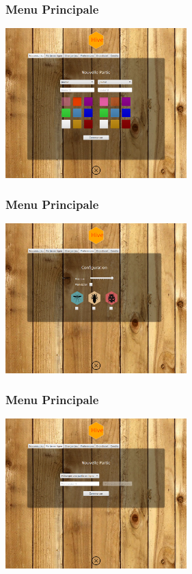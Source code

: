 \documentclass{beamer}
\begin{document}
\begin{frame}
    \frametitle{Menu Principale}
    \begin{center}
    \includegraphics[width=7cm]{menu.png}
    \end{center}
\end{frame}
\begin{frame}
    \frametitle{Menu Principale}
    \begin{center}
    \includegraphics[width=7cm]{preferences.png}
    \end{center}
\end{frame}
\begin{frame}
    \frametitle{Menu Principale}
    \begin{center}
    \includegraphics[width=7cm]{PartieEnLigne.png}
    \end{center}
\end{frame}
\end{document}
